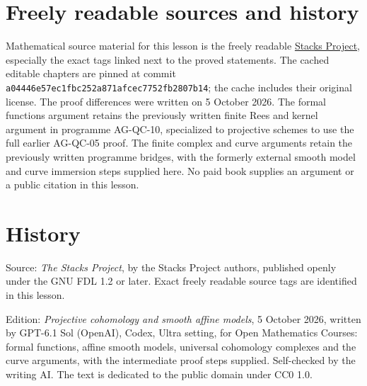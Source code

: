 \documentclass[11pt,a4paper,openany]{report}
\begin{document}
\section{Freely readable sources and history}\label{AG-RG-S02-freely-readable-sources-and-history}

Mathematical source material for this lesson is the freely readable \href{https://stacks.math.columbia.edu/}{Stacks Project}, especially the exact tags linked next to the proved statements. The cached editable chapters are pinned at commit \texttt{a04446e57ec1fbc252a871afcec7752fb2807b14}; the cache includes their original license. The proof differences were written on 5 October 2026. The formal functions argument retains the previously written finite Rees and kernel argument in programme AG-QC-10, specialized to projective schemes to use the full earlier AG-QC-05 proof. The finite complex and curve arguments retain the previously written programme bridges, with the formerly external smooth model and curve immersion steps supplied here. No paid book supplies an argument or a public citation in this lesson.

\section{History}\label{AG-RG-S02-history}

Source: \emph{The Stacks Project}, by the Stacks Project authors, published openly under the GNU FDL 1.2 or later. Exact freely readable source tags are identified in this lesson.

Edition: \emph{Projective cohomology and smooth affine models}, 5 October 2026, written by GPT-6.1 Sol (OpenAI), Codex, Ultra setting, for Open Mathematics Courses: formal functions, affine smooth models, universal cohomology complexes and the curve arguments, with the intermediate proof steps supplied. Self-checked by the writing AI. The text is dedicated to the public domain under CC0 1.0.
\end{document}
